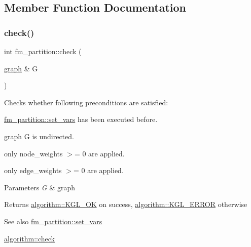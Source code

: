 \subsection{Member Function Documentation}
\mbox{\label{classfm__partition_af72a9fcc300ab0f202168c819b089e5d}} 
\subsubsection{\texorpdfstring{check()}{check()}}
{\footnotesize\ttfamily int fm\+\_\+partition\+::check (\begin{DoxyParamCaption}\item[{\mbox{\hyperlink{classgraph}{graph}} \&}]{G }\end{DoxyParamCaption})\hspace{0.3cm}{\ttfamily [virtual]}}

Checks whether following preconditions are satisfied\+: 
\begin{DoxyItemize}
\item \mbox{\hyperlink{classfm__partition_aa15471da2b6a0f14060b0c4091c6b05c}{fm\+\_\+partition\+::set\+\_\+vars}} has been executed before. 
\item graph {\ttfamily G} is undirected. 
\item only node\+\_\+weights $>$= 0 are applied. 
\item only edge\+\_\+weights $>$= 0 are applied. 
\end{DoxyItemize}


\begin{DoxyParams}{Parameters}
{\em G} & graph \\
\hline
\end{DoxyParams}
\begin{DoxyReturn}{Returns}
{\ttfamily \mbox{\hyperlink{classalgorithm_af1a0078e153aa99c24f9bdf0d97f6710aae4c1cd7fe8d8cf4b143241a6e7c31cf}{algorithm\+::\+K\+G\+L\+\_\+\+OK}}} on success, {\ttfamily \mbox{\hyperlink{classalgorithm_af1a0078e153aa99c24f9bdf0d97f6710ae67bf27b2ef31f73e545a7f9f4a69556}{algorithm\+::\+K\+G\+L\+\_\+\+E\+R\+R\+OR}}} otherwise 
\end{DoxyReturn}
\begin{DoxySeeAlso}{See also}
\mbox{\hyperlink{classfm__partition_aa15471da2b6a0f14060b0c4091c6b05c}{fm\+\_\+partition\+::set\+\_\+vars}} 

\mbox{\hyperlink{classalgorithm_a76361fb03ad1cf643affc51821e43bed}{algorithm\+::check}} 
\end{DoxySeeAlso}


